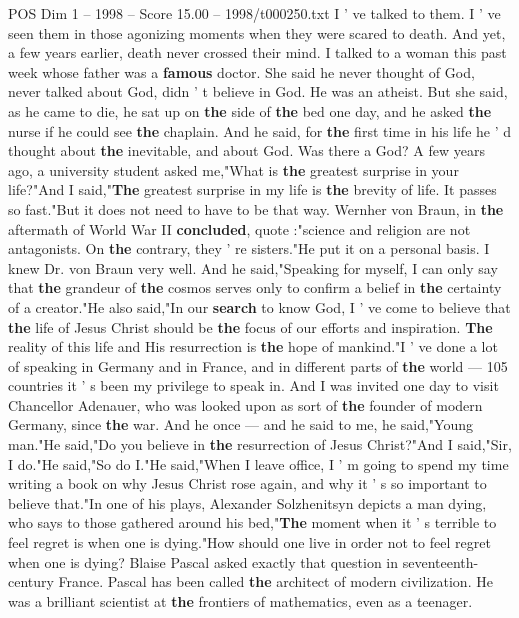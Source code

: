 \begin{textsample}{POS Dim 1 – 1998 – Score 15.00 – 1998/t000250.txt}
I ' ve talked to them.
I ' ve seen them in those agonizing moments when they were scared to death.
And yet, a few years earlier, death never crossed their mind.
I talked to a woman this past week whose father was a \textbf{famous} doctor.
She said he never thought of God, never talked about God, didn ' t believe in God.
He was an atheist.
But she said, as he came to die, he sat up on \textbf{the} side of \textbf{the} bed one day, and he asked \textbf{the} nurse if he could see \textbf{the} chaplain.
And he said, for \textbf{the} first time in his life he ' d thought about \textbf{the} inevitable, and about God.
Was there a God?
A few years ago, a university student asked me,"What is \textbf{the} greatest surprise in your life?"And I said,"\textbf{The} greatest surprise in my life is \textbf{the} brevity of life.
It passes so fast."But it does not need to have to be that way.
Wernher von Braun, in \textbf{the} aftermath of World War II \textbf{concluded}, quote :"science and religion are not antagonists.
On \textbf{the} contrary, they ' re sisters."He put it on a personal basis.
I knew Dr. von Braun very well.
And he said,"Speaking for myself, I can only say that \textbf{the} grandeur of \textbf{the} cosmos serves only to confirm a belief in \textbf{the} certainty of a creator."He also said,"In our \textbf{search} to know God, I ' ve come to believe that \textbf{the} life of Jesus Christ should be \textbf{the} focus of our efforts and inspiration. \textbf{The} reality of this life and His resurrection is \textbf{the} hope of mankind."I ' ve done a lot of speaking in Germany and in France, and in different parts of \textbf{the} world — 105 countries it ' s been my privilege to speak in.
And I was invited one day to visit Chancellor Adenauer, who was looked upon as sort of \textbf{the} founder of modern Germany, since \textbf{the} war.
And he once — and he said to me, he said,"Young man."He said,"Do you believe in \textbf{the} resurrection of Jesus Christ?"And I said,"Sir, I do."He said,"So do I."He said,"When I leave office, I ' m going to spend my time writing a book on why Jesus Christ rose again, and why it ' s so important to believe that."In one of his plays, Alexander Solzhenitsyn depicts a man dying, who says to those gathered around his bed,"\textbf{The} moment when it ' s terrible to feel regret is when one is dying."How should one live in order not to feel regret when one is dying?
Blaise Pascal asked exactly that question in seventeenth-century France.
Pascal has been called \textbf{the} architect of modern civilization.
He was a brilliant scientist at \textbf{the} frontiers of mathematics, even as a teenager.

\end{textsample}
